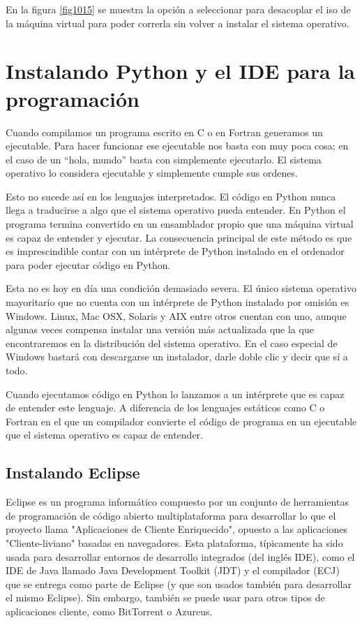 \documentclass[12pt, twoside]{report}
\begin{document}
En la figura \ref{fig1015} se muestra la opción a seleccionar para desacoplar el iso de la máquina virtual para poder correrla sin volver a instalar el sistema operativo.

\chapter{Instalando Python y el IDE para la programación}

Cuando compilamos un programa escrito en C o en Fortran generamos un ejecutable. Para hacer funcionar ese ejecutable nos basta con muy poca cosa; en el caso de un ``hola, mundo'' basta con simplemente ejecutarlo. El sistema operativo lo considera ejecutable y simplemente cumple sus ordenes.

Esto no sucede así en los lenguajes interpretados. El código en Python nunca llega a traducirse a algo que el sistema operativo pueda entender. En Python el programa termina convertido en un ensamblador propio que una máquina virtual es capaz de entender y ejecutar. La consecuencia principal de este método es que es imprescindible contar con un intérprete de Python instalado en el ordenador para poder ejecutar código en Python.

Esta no es hoy en día una condición demasiado severa. El único sistema operativo mayoritario que no cuenta con un intérprete de Python instalado por omisión es Windows. Linux, Mac OSX, Solaris y AIX entre otros cuentan con uno, aunque algunas veces compensa instalar una versión más actualizada que la que encontraremos en la distribución del sistema operativo. En el caso especial de Windows bastará con descargarse un instalador, darle doble clic y decir que sí a todo.

Cuando ejecutamos código en Python lo lanzamos a un intérprete que es capaz de entender este lenguaje. A diferencia de los lenguajes estáticos como C o Fortran en el que un compilador convierte el código de programa en un ejecutable que el sistema operativo es capaz de entender.

\section{Instalando Eclipse}

Eclipse es un programa informático compuesto por un conjunto de herramientas de programación de código abierto multiplataforma para desarrollar lo que el proyecto llama "Aplicaciones de Cliente Enriquecido", opuesto a las aplicaciones "Cliente-liviano" basadas en navegadores. Esta plataforma, típicamente ha sido usada para desarrollar entornos de desarrollo integrados (del inglés IDE), como el IDE de Java llamado Java Development Toolkit (JDT) y el compilador (ECJ) que se entrega como parte de Eclipse (y que son usados también para desarrollar el mismo Eclipse). Sin embargo, también se puede usar para otros tipos de aplicaciones cliente, como BitTorrent o Azureus.
\end{document}
